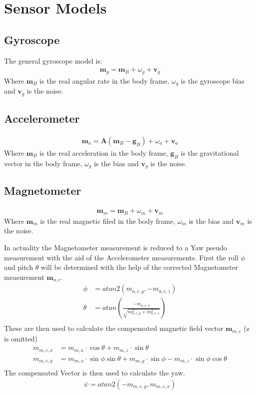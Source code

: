 \documentclass[10pt,a4paper]{article}
\newcommand{\M}[1]{\mathbf{#1}}
\newcommand{\V}[1]{\mathbf{#1}}
\begin{document}
\section{Sensor Models}

\subsection{Gyroscope}
The general gyroscope model is:
\begin{align}
  \V m_g = \V m_B + \omega_g + \V v_g
\end{align}
Where $\V m_B$ is the real angular rate in the body frame, $\omega_g$ is the gyroscope bias and $\V v_g$ is the noise.
\subsection{Accelerometer}
\begin{align}
  \V m_a =  \M A (\V m_B - \V g_B) + \omega_a + \V v_a
\end{align}
Where $\V m_B$ is the real acceleration in the body frame, $\V g_B$ is the gravitational vector in the body frame, $\omega_g$ is the bias and $\V v_g$ is the noise.

\subsection{Magnetometer}
\begin{align}
  \V m_m = \V m_B + \omega_m + \V v_m
\end{align}
Where $\V m_m$ is the real magnetic filed in the body frame, $\omega_m$ is the bias and $\V v_m$ is the noise.

In actuality the Magnetometer measurement is reduced to a Yaw pseudo measurement with the aid of the Accelerometer measurements.
First the roll $\phi$ and pitch $\theta$ will be determined with the help of the corrected Magnetometer measurement $\V m_{a,c}$.
\begin{align}
  \phi &= atan2(m_{a,c,y}, - m_{a,c,z}) \\ 
  \theta &= atan\left (\frac {- m_{a,c,x}}{\sqrt{m_{a,c,y}^2 + m_{a,c,z}^2}} \right) \\ 
\end{align}
These are then used to calculate the compensated magnetic field vector $\V m_{m,c}$ (z is omitted)
\begin{align}
  m_{m,c,x} &= m_{m,x} \cdot \cos {\theta} + m_{m,z} \cdot \sin {\theta} \\
  m_{m,c,y} &= m_{m,x} \cdot \sin {\phi} \sin {\theta} + m_{m,y} \cdot \sin {\phi} - m_{m,z} \cdot \sin {\phi} \cos {\theta}\\
\end{align}
The compensated Vector is then used to calculate the yaw.
\begin{align}
  \psi = atan2(- m_{m,c,y}, m_{m,c,x})
\end{align}
\end{document}
